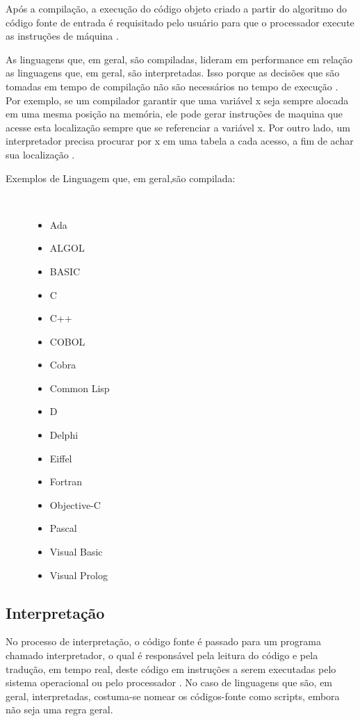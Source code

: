 Após a compilação, a execução do código objeto criado a partir do algoritmo do
 código fonte de entrada é requisitado pelo usuário para que o processador 
execute as instruções de máquina \cite{ref6}.

As linguagens que, em geral, são compiladas, lideram em performance em relação
 as linguagens que, em geral, são interpretadas. Isso porque as decisões que são
 tomadas em tempo de compilação não são necessários no tempo de execução \cite{ref7}.
Por exemplo, se um compilador garantir que uma variável x seja sempre alocada 
em uma  mesma posição na memória,  ele pode gerar instruções de maquina que 
acesse esta localização sempre que se referenciar a variável x. 
Por outro lado, um interpretador precisa procurar  por x em uma tabela a cada 
acesso, a fim de achar sua localização \cite{ref8}.

\begin{description}
    \item[Exemplos de Linguagem que, em geral,são compilada:]\
    \begin{itemize}
      \item  Ada
      \item  ALGOL
      \item  BASIC
      \item  C
      \item  C++
      \item  COBOL
      \item  Cobra
      \item  Common Lisp
      \item  D
      \item  Delphi
      \item  Eiffel
      \item  Fortran
      \item  Objective-C
      \item  Pascal
      \item  Visual Basic
      \item  Visual Prolog
    \end{itemize}
\end{description}

\subsection{Interpretação}

No processo de interpretação, o código fonte é passado para um programa chamado
 interpretador, o qual é responsável pela leitura do código e pela tradução, 
em tempo real, deste código em instruções a serem executadas pelo sistema 
operacional ou  pelo processador \cite{ref8}. No caso de linguagens que são, em geral, 
interpretadas, costuma-se nomear os códigos-fonte como scripts, embora não seja 
uma regra geral.

